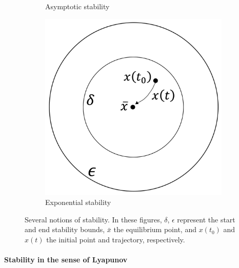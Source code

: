 \begin{figure}
\begin{subfigure}{0.31\textwidth}
    \caption{Asymptotic stability} \label{fig:AS}
  \end{subfigure}
  \hspace*{\fill} %
  \begin{subfigure}{0.31\textwidth}
    \centering
    \includegraphics[width=\linewidth]{figures/figure-ES.jpg}
    \caption{Exponential stability} \label{fig:ES}
  \end{subfigure}

  \caption[Several notions of stability.]{Several notions of stability. In these figures, $\delta$, $\epsilon$ represent the start and end stability bounds, $\bar{x}$ the equilibrium point, and $x\left(t_0\right)$ and $x\left(t\right)$ the initial point and trajectory, respectively.} \label{fig:stability_notions}
\end{figure}

\paragraph{Stability in the sense of Lyapunov}

